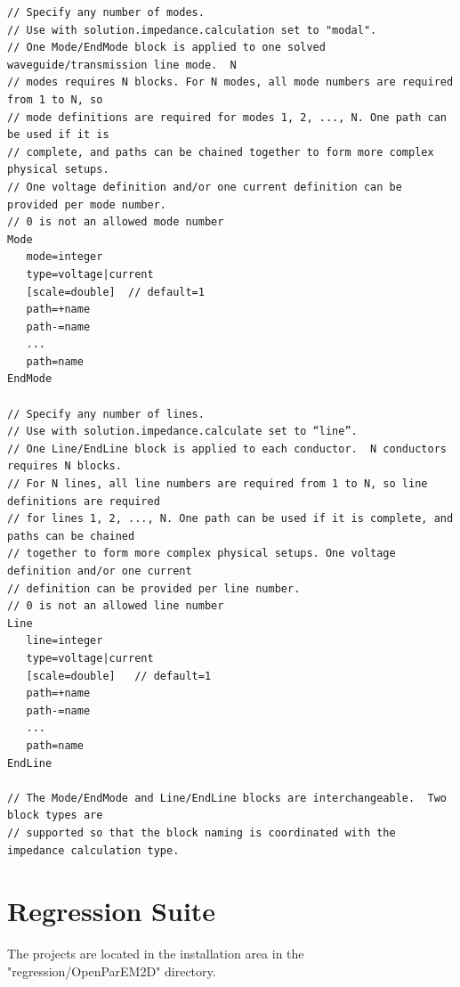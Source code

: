 \documentclass[titlepage]{article}
\renewcommand\_{\textunderscore\linebreak[1]}
\begin{document}
\begin{Verbatim}[fontsize=\small]
// Specify any number of modes.
// Use with solution.impedance.calculation set to "modal".
// One Mode/EndMode block is applied to one solved waveguide/transmission line mode.  N
// modes requires N blocks. For N modes, all mode numbers are required from 1 to N, so 
// mode definitions are required for modes 1, 2, ..., N. One path can be used if it is
// complete, and paths can be chained together to form more complex physical setups.
// One voltage definition and/or one current definition can be provided per mode number.
// 0 is not an allowed mode number
Mode
   mode=integer 
   type=voltage|current
   [scale=double]  // default=1
   path=+name
   path-=name
   ...
   path=name
EndMode

// Specify any number of lines.
// Use with solution.impedance.calculate set to “line”.
// One Line/EndLine block is applied to each conductor.  N conductors requires N blocks.
// For N lines, all line numbers are required from 1 to N, so line definitions are required
// for lines 1, 2, ..., N. One path can be used if it is complete, and paths can be chained
// together to form more complex physical setups. One voltage definition and/or one current
// definition can be provided per line number.
// 0 is not an allowed line number
Line
   line=integer 
   type=voltage|current
   [scale=double]   // default=1
   path=+name
   path-=name
   ...
   path=name
EndLine

// The Mode/EndMode and Line/EndLine blocks are interchangeable.  Two block types are 
// supported so that the block naming is coordinated with the impedance calculation type.
\end{Verbatim}

\newpage
\section{Regression Suite}
\label{sec:regression_suite}

The projects are located in the installation area in the "regression/OpenParEM2D" directory.
\end{document}
